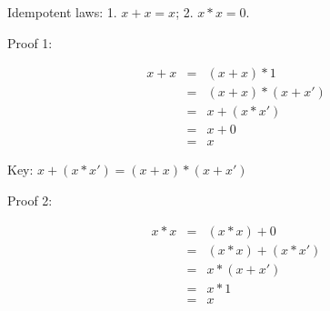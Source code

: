 \documentclass{article}
\begin{document}
Idempotent laws: 1. $x + x = x$; 2. $x * x = 0$.

Proof 1:

\begin{eqnarray*}
x + x & = & (x + x) * 1 \\
& = & (x + x) * (x + x') \\
& = & x + (x * x') \\
& = & x + 0 \\
& = & x
\end{eqnarray*}

Key: $x + (x * x') = (x + x) * (x + x')$

Proof 2:

\begin{eqnarray*}
x * x & = & (x * x) + 0 \\
& = & (x * x) + (x * x') \\
& = & x * (x + x') \\
& = & x * 1 \\
& = & x
\end{eqnarray*}
\end{document}
